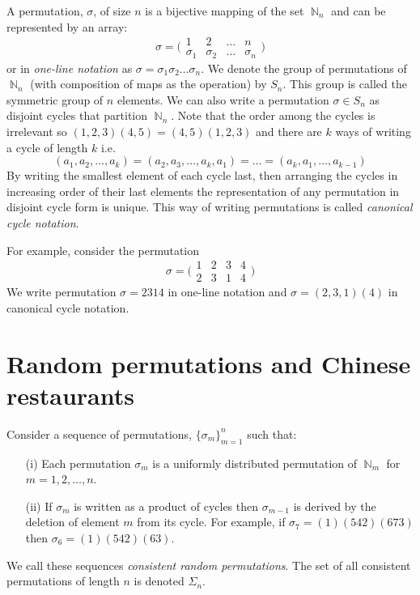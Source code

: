 \documentclass[oneside]{book} %
\theoremstyle{definition}
\numberwithin{equation}{section}
\DeclareMathOperator{\N}{\mathbb{N}}
\begin{document}
A permutation, $\sigma$, of size $n$ is a bijective mapping of the set  $\N_n$ and can be represented by an array:
\[
 \sigma  = \bigl(\begin{smallmatrix}
    1 & 2 & \dots & n \\
    \sigma_1 & \sigma_2 & \dots & \sigma_n
  \end{smallmatrix}\bigr)
\]
or in \emph{one-line notation} as $\sigma = \sigma_1\sigma_2\dots\sigma_n$.  We denote the group of permutations of $\N_n$
(with composition of maps as the operation) by $S_n$.  This group is called the symmetric group of $n$ elements. We can also write a permutation $\sigma \in S_n$ as disjoint cycles that partition $\N_n$.  Note that the order among the cycles is irrelevant so $(1,2,3)(4,5) = (4,5)(1,2,3)$ and there are $k$ ways of writing a cycle of length $k$ i.e.
\[
 (a_1,a_2,\dots,a_k) = (a_2,a_3,\dots,a_k,a_1) = \dots = (a_k,a_1,\dots,a_{k-1})
\]
By writing the smallest element of each cycle last, then arranging the cycles in increasing order of their last elements the representation of any permutation in disjoint cycle form is unique.  This way of writing permutations is called \emph{canonical cycle notation}.
 
For example, consider the permutation
\[
 \sigma  = \bigl(\begin{smallmatrix}
    1 & 2 & 3 & 4 \\
    2 & 3 & 1 & 4
  \end{smallmatrix}\bigr)
\]
We write permutation $\sigma = 2314$ in one-line notation and $\sigma  = (2,3,1)(4)$ in canonical cycle notation.

\section{Random permutations and Chinese restaurants}
Consider a sequence of permutations, $\{\sigma_m\}_{m=1}^n$ such that:
\begin{itemize}
 \item[(i)] Each permutation $\sigma_m$ is a uniformly distributed permutation of $\N_m$ for $m = 1,2,\dots,n$.
 \item[(ii)] If $\sigma_m$ is written as a product of cycles then $\sigma_{m-1}$ is derived by the deletion of element $m$ from its cycle.  
 For example, if $\sigma_7 = (1)(542)(673)$  then 
$\sigma_6 = (1)(542)(63)$.
 \end{itemize}
We call these sequences \emph{consistent random permutations}.  The set of all consistent permutations of length $n$ is denoted $\Sigma_n$.  
\end{document}
